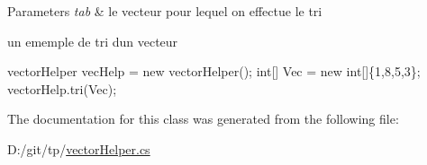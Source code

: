 \begin{DoxyParams}{Parameters}
{\em tab} & le vecteur pour lequel on effectue le tri\\
\hline
\end{DoxyParams}


un ememple de tri d\textquotesingle{}un vecteur 
\begin{DoxyCode}
vectorHelper vecHelp = \textcolor{keyword}{new} vectorHelper();
\textcolor{keywordtype}{int}[] Vec = \textcolor{keyword}{new} \textcolor{keywordtype}{int}[]\{1,8,5,3\};
vectorHelp.tri(Vec);
\end{DoxyCode}
 

The documentation for this class was generated from the following file\+:\begin{DoxyCompactItemize}
\item 
D\+:/git/tp/\hyperlink{vector_helper_8cs}{vector\+Helper.\+cs}\end{DoxyCompactItemize}
